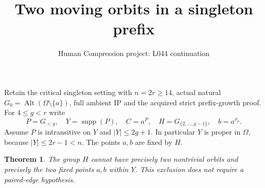 \documentclass[11pt,a4paper]{article}
\title{Two moving orbits in a singleton prefix}
\author{Human Compression project: L044 continuation}
\date{}
\newtheorem{theorem}{Theorem}
\begin{document}
\maketitle
Retain the critical singleton setting with $n=2r\ge14$,
actual natural $G_0=\operatorname{Alt}(\Omega\setminus\{a\})$,
full ambient IP and the acquired strict prefix-growth proof.
For $4\le g<r$ write
\[
 P=G_{<g},\quad Y=\operatorname{supp}(P),\quad
 C=a^P,\quad H=G_{\{2,\ldots,g-1\}},\quad b=a^{\rho_0}.
\]
Assume $P$ is intransitive on $Y$ and $|Y|\le2g+1$.
In particular $Y$ is proper in $\Omega$, because
$|Y|\le2r-1<n$. The points $a,b$ are fixed by $H$.

\begin{theorem}
The group $H$ cannot have precisely two nontrivial orbits and
precisely the two fixed points $a,b$ within $Y$.
This exclusion does not require a paired-edge hypothesis.
\end{theorem}
\end{document}
